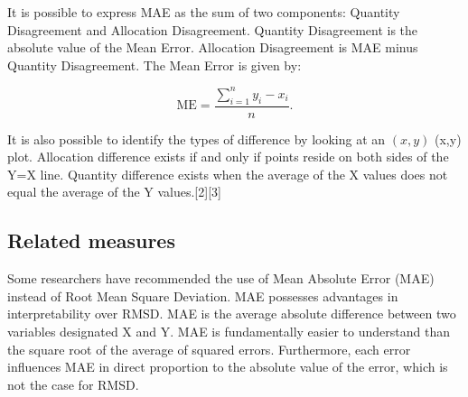 \documentclass[]{report}
\begin{document}
It is possible to express MAE as the sum of two components: Quantity Disagreement and Allocation Disagreement. Quantity Disagreement is the absolute value of the Mean Error. Allocation Disagreement is MAE minus Quantity Disagreement. The Mean Error is given by:

\[{\displaystyle \mathrm {ME} ={\frac {\sum _{i=1}^{n}y_{i}-x_{i}}{n}}.} \]

It is also possible to identify the types of difference by looking at an ${\displaystyle (x,y)}$ (x,y) plot. Allocation difference exists if and only if points reside on both sides of the Y=X line. Quantity difference exists when the average of the X values does not equal the average of the Y values.[2][3]
\subsection*{Related measures}
Some researchers have recommended the use of Mean Absolute Error (MAE) instead of Root Mean Square Deviation. MAE possesses advantages in interpretability over RMSD. MAE is the average absolute difference between two variables designated X and Y. MAE is fundamentally easier to understand than the square root of the average of squared errors. Furthermore, each error influences MAE in direct proportion to the absolute value of the error, which is not the case for RMSD.
\end{document}
